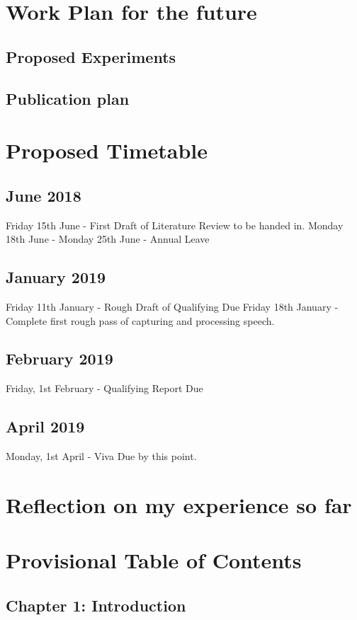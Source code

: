 \documentclass{article}
\begin{document}
	\section{Work Plan for the future}	
	\subsection{Proposed Experiments}
	\subsection{Publication plan}
	
	\section{Proposed Timetable}
	
	\subsection{June 2018}
	Friday 15th June - First Draft of Literature Review to be handed in.
	\newline
	Monday 18th June - Monday 25th June - Annual Leave
	\subsection{January 2019}
	Friday 11th January - Rough Draft of Qualifying Due
	Friday 18th January - Complete first rough pass of capturing and processing speech.
	
	\subsection{February 2019}
	Friday, 1st February - Qualifying Report Due
	\subsection{April 2019}
	Monday, 1st April - Viva Due by this point.
	
	\section{Reflection on my experience so far}
	
	\section{Provisional Table of Contents}
	\subsection{Chapter 1: Introduction}
\end{document}
